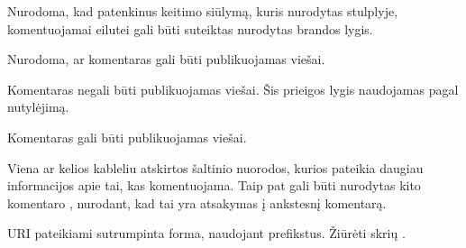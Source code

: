 \documentclass[letterpaper,10pt,lithuanian]{sphinxmanual}
\begin{document}

\begin{fulllineitems}
\label{\detokenize{dimensijos:comment.level}}
\pysigstartsignatures
\pysigline
{}
\pysigstopsignatures
\sphinxAtStartPar
Nurodoma, kad patenkinus keitimo siūlymą, kuris nurodytas
{\hyperref[\detokenize{dimensijos:comment.prepare}]{}} stulplyje, komentuojamai eilutei gali būti
suteiktas nurodytas brandos lygis.

\end{fulllineitems}


\begin{fulllineitems}
\label{\detokenize{dimensijos:comment.access}}
\pysigstartsignatures
\pysigline
{}
\pysigstopsignatures
\sphinxAtStartPar
Nurodoma, ar komentaras gali būti publikuojamas viešai.
\begin{description}
\sphinxAtStartPar
Komentaras negali būti publikuojamas viešai. Šis prieigos lygis
naudojamas pagal nutylėjimą.

\sphinxAtStartPar
Komentaras gali būti publikuojamas viešai.

\end{description}

\end{fulllineitems}


\begin{fulllineitems}
\label{\detokenize{dimensijos:comment.uri}}
\pysigstartsignatures
\pysigline
{}
\pysigstopsignatures
\sphinxAtStartPar
Viena ar kelios kableliu atskirtos šaltinio nuorodos, kurios pateikia
daugiau informacijos apie tai, kas komentuojama. Taip pat gali būti
nurodytas kito komentaro {\hyperref[\detokenize{dimensijos:comment.id}]{}}, nurodant, kad tai yra
atsakymas į ankstesnį komentarą.

\sphinxAtStartPar
URI pateikiami sutrumpinta forma, naudojant prefikstus. Žiūrėti skrių
{\hyperref[\detokenize{zodynai:vocab}]{}}.

\end{fulllineitems}
\end{document}
